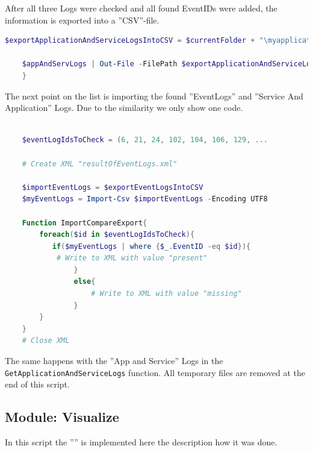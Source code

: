 \clearpage
After all three Logs were checked and all found EventIDs were added, the information is exported into a ''CSV''-file.
\begin{lstlisting}[caption=Function GetApplicationAndServiceLogs Part 2, language=PowerShell]
    $exportApplicationAndServiceLogsIntoCSV = $currentFolder + "\myapplicationandservicelogs.csv"

    $appAndServLogs | Out-File -FilePath $exportApplicationAndServiceLogsIntoCSV
    }
\end{lstlisting}
The next point on the list is importing the found ''EventLogs'' and ''Service And Application'' Logs. Due to the similarity we only show one code.
\begin{lstlisting}[caption=Function ImportCompareExport, language=PowerShell]
    
    $eventLogIdsToCheck = (6, 21, 24, 102, 104, 106, 129, ...

    # Create XML "resultOfEventLogs.xml"

    $importEventLogs = $exportEventLogsIntoCSV
    $myEventLogs = Import-Csv $importEventLogs -Encoding UTF8

    Function ImportCompareExport{
        foreach($id in $eventLogIdsToCheck){
           if($myEventLogs | where {$_.EventID -eq $id}){
            # Write to XML with value "present"
                }
                else{
                    # Write to XML with value "missing"
                }
        }
    }
    # Close XML
\end{lstlisting}
The same happens with the ''App and Service'' Logs in the \lstinline|GetApplicationAndServiceLogs| function. All temporary files are removed at the end of this script.
\clearpage
\subsection{Module: Visualize}
In this script the '''' is implemented here the description how it was done.
